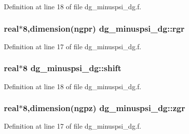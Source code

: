 Definition at line 18 of file dg\_\-minuspsi\_\-dg.f.\hypertarget{namespacedg__minuspsi__dg_0c32314aec56f7439884635ae85f8414}{
\subsubsection[rgr]{\setlength{\rightskip}{0pt plus 5cm}real$\ast$8,dimension(ngpr) {\bf dg\_\-minuspsi\_\-dg::rgr}}}
\label{namespacedg__minuspsi__dg_0c32314aec56f7439884635ae85f8414}




Definition at line 17 of file dg\_\-minuspsi\_\-dg.f.\hypertarget{namespacedg__minuspsi__dg_1f21182b81c907694c4d1674bc7ef246}{
\subsubsection[shift]{\setlength{\rightskip}{0pt plus 5cm}real$\ast$8 {\bf dg\_\-minuspsi\_\-dg::shift}}}
\label{namespacedg__minuspsi__dg_1f21182b81c907694c4d1674bc7ef246}




Definition at line 18 of file dg\_\-minuspsi\_\-dg.f.\hypertarget{namespacedg__minuspsi__dg_055027e90abf39aceabd4a50f02421ac}{
\subsubsection[zgr]{\setlength{\rightskip}{0pt plus 5cm}real$\ast$8,dimension(ngpz) {\bf dg\_\-minuspsi\_\-dg::zgr}}}
\label{namespacedg__minuspsi__dg_055027e90abf39aceabd4a50f02421ac}




Definition at line 17 of file dg\_\-minuspsi\_\-dg.f.